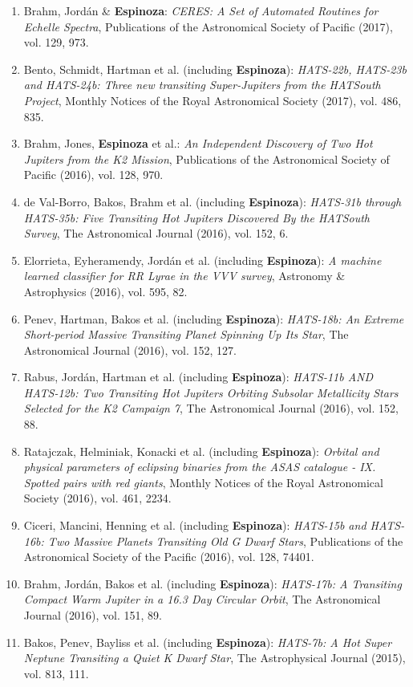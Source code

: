 \documentclass[12pt, a4paper]{article} %
\begin{document}
\begin{flushleft}
\begin{enumerate}
\item Brahm, Jord\'an \& \textbf{Espinoza}: \textit{CERES: A Set of Automated Routines for Echelle Spectra}, Publications of the 
Astronomical Society of Pacific (2017), vol. 129, 973.
\item Bento, Schmidt, Hartman et al. (including \textbf{Espinoza}): \textit{HATS-22b, HATS-23b and HATS-24b: Three new transiting Super-Jupiters from the HATSouth Project}, Monthly Notices of the Royal Astronomical Society (2017), vol. 486, 835.
\item Brahm, Jones, \textbf{Espinoza} et al.: \textit{An Independent Discovery of Two Hot Jupiters from the K2 Mission}, 
Publications of the Astronomical Society of Pacific (2016), vol. 128, 970.
\item de Val-Borro, Bakos, Brahm et al. (including \textbf{Espinoza}): \textit{HATS-31b through HATS-35b: Five Transiting Hot Jupiters Discovered By the HATSouth Survey}, The Astronomical Journal (2016), vol. 152, 6.
\item Elorrieta, Eyheramendy, Jord\'an et al. (including \textbf{Espinoza}): \textit{A machine learned classifier for RR Lyrae in the 
VVV survey}, Astronomy \& Astrophysics (2016), vol. 595, 82.
\item Penev, Hartman, Bakos et al. (including \textbf{Espinoza}): \textit{HATS-18b: An Extreme Short-period Massive Transiting Planet Spinning Up Its Star}, The Astronomical Journal (2016), vol. 152, 127.
\item Rabus, Jord\'an, Hartman et al. (including \textbf{Espinoza}): \textit{HATS-11b AND HATS-12b: Two Transiting Hot Jupiters Orbiting Subsolar Metallicity Stars Selected for the K2 Campaign 7}, The Astronomical Journal (2016), vol. 152, 88.
\item Ratajczak, Helminiak, Konacki et al. (including \textbf{Espinoza}): \textit{Orbital and physical parameters of eclipsing binaries from the ASAS catalogue - IX. Spotted pairs with red giants}, Monthly Notices of the Royal Astronomical Society (2016), vol. 461, 2234.
\item Ciceri, Mancini, Henning et al. (including \textbf{Espinoza}): \textit{HATS-15b and HATS-16b: Two Massive Planets Transiting Old G Dwarf Stars}, Publications of the Astronomical Society of the Pacific (2016), vol. 128, 74401.
\item Brahm, Jord\'an, Bakos et al. (including \textbf{Espinoza}): \textit{HATS-17b: A Transiting Compact Warm Jupiter in a 16.3 Day Circular Orbit}, The Astronomical Journal (2016), vol. 151, 89.
\item Bakos, Penev, Bayliss et al. (including \textbf{Espinoza}): \textit{HATS-7b: A Hot Super Neptune Transiting a Quiet K Dwarf Star}, The Astrophysical Journal (2015), vol. 813, 111.

\end{enumerate}
\end{flushleft}
\end{document}
